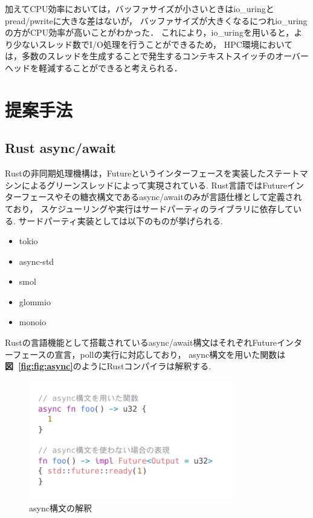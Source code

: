 \documentclass[a4paper,11pt]{jreport}
\newcommand\figref[1]{\textbf{図~\ref{fig:#1}}}
\begin{document}
加えてCPU効率においては，バッファサイズが小さいときはio\_uringとpread/pwriteに大きな差はないが，
バッファサイズが大きくなるにつれio\_uringの方がCPU効率が高いことがわかった．
これにより，io\_uringを用いると，より少ないスレッド数でI/O処理を行うことができるため，
HPC環境においては，多数のスレッドを生成することで発生するコンテキストスイッチのオーバーヘッドを軽減することができると考えられる．

\chapter{提案手法}
\section{Rust async/await}
Rustの非同期処理機構\cite{rust-async-rfc}は，Futureというインターフェースを実装したステートマシンによるグリーンスレッドによって実現されている.
Rust言語ではFutureインターフェースやその糖衣構文であるasync/awaitのみが言語仕様として定義されており，
スケジューリングや実行はサードパーティのライブラリに依存している.
サードパーティ実装としては以下のものが挙げられる.

\begin{itemize}
	\item tokio
	\item async-std
	\item smol
	\item glommio
	\item monoio
\end{itemize}

Rustの言語機能として搭載されているasync/await構文はそれぞれFutureインターフェースの宣言，pollの実行に対応しており，
async構文を用いた関数は\figref{fig:async}のようにRustコンパイラは解釈する.



\begin{figure}[tb]
	\centering
	\includegraphics[width=9cm, bb=0 0 800 550]{figures/async_future.png}
	\caption{async構文の解釈}
	\label{fig:async}
\end{figure}
\end{document}
